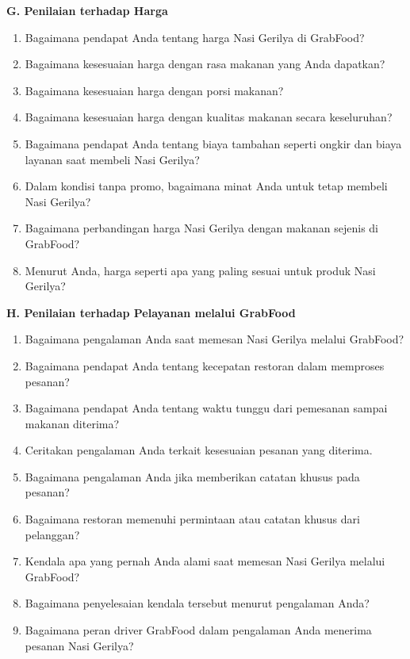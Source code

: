 \documentclass[10pt,a4paper]{article}
\newcommand{\sectionbar}[1]{%
  \Needspace{5\baselineskip}
  \vspace{4mm}
  \noindent\colorbox{Soft}{%
    \parbox{\dimexpr\linewidth-2\fboxsep\relax}{%
      \large\bfseries\textcolor{Primary}{#1}
    }%
  }\par\vspace{1mm}
}
\newcommand{\probe}[1]{%
  \vspace{1mm}
  \noindent{\small\textbf{\textcolor{Accent}{Probing:}} \textcolor{TextGray}{#1}}\par
}
\begin{document}
\sectionbar{G. Penilaian terhadap Harga}
\begin{enumerate}[label=\arabic*.,leftmargin=*,itemsep=1.2mm,resume]
\item Bagaimana pendapat Anda tentang harga Nasi Gerilya di GrabFood?
\item Bagaimana kesesuaian harga dengan rasa makanan yang Anda dapatkan?
\item Bagaimana kesesuaian harga dengan porsi makanan?
\item Bagaimana kesesuaian harga dengan kualitas makanan secara keseluruhan?
\item Bagaimana pendapat Anda tentang biaya tambahan seperti ongkir dan biaya layanan saat membeli Nasi Gerilya?
\item Dalam kondisi tanpa promo, bagaimana minat Anda untuk tetap membeli Nasi Gerilya?
\item Bagaimana perbandingan harga Nasi Gerilya dengan makanan sejenis di GrabFood?
\item Menurut Anda, harga seperti apa yang paling sesuai untuk produk Nasi Gerilya?
\end{enumerate}
\probe{Gali batas harga yang dianggap wajar dan pengaruh promo terhadap keputusan membeli.}

\sectionbar{H. Penilaian terhadap Pelayanan melalui GrabFood}
\begin{enumerate}[label=\arabic*.,leftmargin=*,itemsep=1.2mm,resume]
\item Bagaimana pengalaman Anda saat memesan Nasi Gerilya melalui GrabFood?
\item Bagaimana pendapat Anda tentang kecepatan restoran dalam memproses pesanan?
\item Bagaimana pendapat Anda tentang waktu tunggu dari pemesanan sampai makanan diterima?
\item Ceritakan pengalaman Anda terkait kesesuaian pesanan yang diterima.
\item Bagaimana pengalaman Anda jika memberikan catatan khusus pada pesanan?
\item Bagaimana restoran memenuhi permintaan atau catatan khusus dari pelanggan?
\item Kendala apa yang pernah Anda alami saat memesan Nasi Gerilya melalui GrabFood?
\item Bagaimana penyelesaian kendala tersebut menurut pengalaman Anda?
\item Bagaimana peran driver GrabFood dalam pengalaman Anda menerima pesanan Nasi Gerilya?
\end{enumerate}
\probe{Pisahkan pengalaman dengan restoran dan pengalaman dengan driver jika informan mencampur keduanya.}
\end{document}
